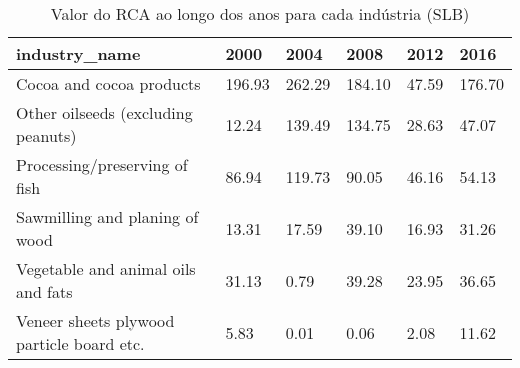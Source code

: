 \begin{table}
\centering
\caption{Valor do RCA ao longo dos anos para cada indústria (SLB)}
\begin{tabular}{p{6cm}p{1.5cm}p{1.5cm}p{1.5cm}p{1.5cm}p{1.5cm}}
\toprule
                            industry\_name &   2000 &   2004 &   2008 &  2012 &   2016 \\
\midrule
                 Cocoa and cocoa products & 196.93 & 262.29 & 184.10 & 47.59 & 176.70 \\
       Other oilseeds (excluding peanuts) &  12.24 & 139.49 & 134.75 & 28.63 &  47.07 \\
            Processing/preserving of fish &  86.94 & 119.73 &  90.05 & 46.16 &  54.13 \\
           Sawmilling and planing of wood &  13.31 &  17.59 &  39.10 & 16.93 &  31.26 \\
       Vegetable and animal oils and fats &  31.13 &   0.79 &  39.28 & 23.95 &  36.65 \\
Veneer sheets plywood particle board etc. &   5.83 &   0.01 &   0.06 &  2.08 &  11.62 \\
\bottomrule
\end{tabular}
\end{table}
